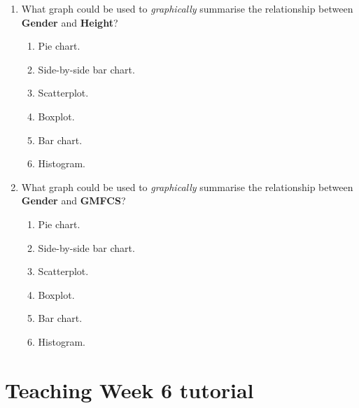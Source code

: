 \documentclass[
  11pt,
  a4paper,
  krantz2]{krantz}
\providecommand{\tightlist}{%
  \setlength{\itemsep}{0pt}\setlength{\parskip}{0pt}}
\begin{document}
\begin{enumerate}
  \begin{enumerate}
  \def\labelenumii{\alph{enumii}.}
  \tightlist
  \item
    Pie chart.
  \item
    Stem-and-leaf plot.
  \item
    Scatterplot.
  \item
    Boxplot.
  \item
    Bar chart.
  \item
    Histogram.
  \end{enumerate}
\item
  What graph could be used to \emph{graphically} summarise the relationship between \textbf{Gender} and \textbf{Height}?

  \begin{enumerate}
  \def\labelenumii{\alph{enumii}.}
  \tightlist
  \item
    Pie chart.
  \item
    Side-by-side bar chart.
  \item
    Scatterplot.
  \item
    Boxplot.
  \item
    Bar chart.
  \item
    Histogram.
  \end{enumerate}
\item
  What graph could be used to \emph{graphically} summarise the relationship between \textbf{Gender} and \textbf{GMFCS}?

  \begin{enumerate}
  \def\labelenumii{\alph{enumii}.}
  \tightlist
  \item
    Pie chart.
  \item
    Side-by-side bar chart.
  \item
    Scatterplot.
  \item
    Boxplot.
  \item
    Bar chart.
  \item
    Histogram.
  \end{enumerate}
\end{enumerate}

\chapter{Teaching Week 6 tutorial}\label{Lecture6}
\end{document}
